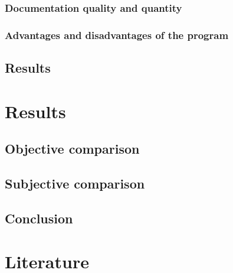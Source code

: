 \documentclass{article}
\begin{document}
\subsubsection{Documentation quality and quantity}
\subsubsection{Advantages and disadvantages of the program}
\subsection{Results}

\newpage
\section{Results}
\subsection{Objective comparison}
\subsection{Subjective comparison}
\subsection{Conclusion}

\newpage
\section{Literature}
\end{document}
